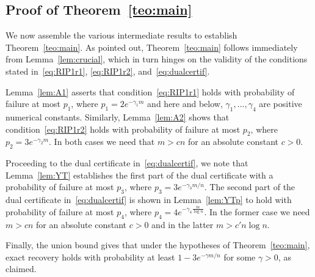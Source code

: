 \documentclass[11pt]{article}
\newcommand{\<}{\langle}
\renewcommand{\>}{\rangle}
\numberwithin{equation}{section}
\begin{document}
\subsection{Proof of Theorem~\ref{teo:main}} \label{subsec:proofoftheorem}

We now assemble the various intermediate results to establish 
Theorem~\ref{teo:main}. As pointed out, Theorem~\ref{teo:main} follows
immediately from Lemma~\ref{lem:crucial}, which in turn hinges on
the validity of the conditions stated in~\eqref{eq:RIP1r1},
\eqref{eq:RIP1r2}, and~\eqref{eq:dualcertif}.

Lemma~\ref{lem:A1} asserts that condition~\eqref{eq:RIP1r1} holds with
probability of failure at most $p_1$, where $p_1 = 2e^{-\gamma_1 m}$
and here and below, $\gamma_{1}, \ldots, \gamma_4$ are positive
numerical constants.  Similarly, Lemma~\ref{lem:A2} shows that
condition~\eqref{eq:RIP1r2} holds with probability of failure at most
$p_2$, where $p_2 = 3e^{-\gamma_2 m}$.  In both cases we need that $m
> cn$ for an absolute constant $c>0$.

Proceeding to the dual certificate in~\eqref{eq:dualcertif}, we note
that Lemma~\ref{lem:YT} establishes the first part of the dual
certificate with a probability of failure at most $p_3$, where $p_3 =
3e^{-\gamma_3 m/n}$. The second part of the dual certificate
in~\eqref{eq:dualcertif} is shown in Lemma~\ref{lem:YTp} to hold with
probability of failure at most $p_4$, where $p_4 = 4e^{-\gamma_4
  \frac{m}{\log n}}$. In the former case we need $m > cn$ for an
absolute constant $c > 0$ and in the latter $m > c' n \log n$.

Finally, the union bound gives that under the hypotheses of
Theorem~\ref{teo:main}, exact recovery holds with probability at least
$1-3e^{-\gamma m/n}$ for some $\gamma > 0$, as claimed.
\end{document}
